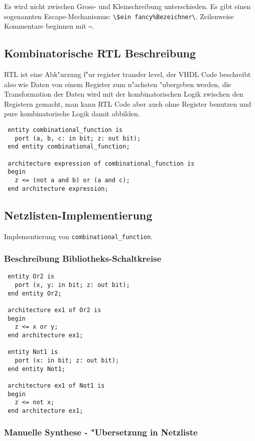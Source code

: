\documentclass[german, 10pt, a4paper, twocolumn]{scrartcl}
\theoremstyle{definition}
\begin{document}
Es wird nicht zwischen Gross- und Kleinschreibung unterschieden. Es gibt einen sogenannten Escape-Mechanismus: \verb#\$ein fancy%Bezeichner\#. Zeilenweise Kommentare beginnen mit \texttt{--}.

\subsection{Kombinatorische RTL Beschreibung}

RTL ist eine Abk"urzung f"ur register transfer level, der VHDL Code beschreibt also wie Daten von einem Register zum n"achsten "ubergeben werden, die Transformation der Daten wird mit der kombinatorischen Logik zwischen den Registern gemacht, man kann RTL Code aber auch ohne Register benutzen und pure kombinatorische Logik damit abbilden.

\begin{verbatim}
 entity combinational_function is
   port (a, b, c: in bit; z: out bit);
 end entity combinational_function;

 architecture expression of combinational_function is
 begin
   z <= (not a and b) or (a and c);
 end architecture expression;
\end{verbatim}

\subsection{Netzlisten-Implementierung}

Implementierung von \texttt{combinational\_function}.

\subsubsection{Beschreibung Bibliotheks-Schaltkreise}

\begin{verbatim}
 entity Or2 is
   port (x, y: in bit; z: out bit);
 end entity Or2;

 architecture ex1 of Or2 is
 begin
   z <= x or y;
 end architecture ex1;

 entity Not1 is
   port (x: in bit; z: out bit);
 end entity Not1;

 architecture ex1 of Not1 is
 begin
   z <= not x;
 end architecture ex1;
\end{verbatim}

\subsubsection{Manuelle Synthese - "Ubersetzung in Netzliste}
\end{document}
